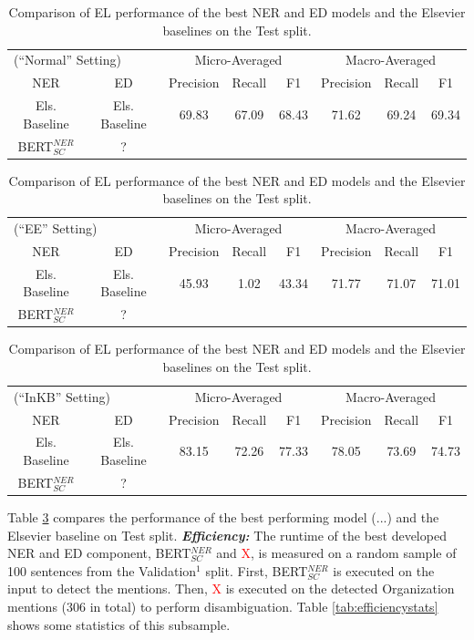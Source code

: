 \documentclass{report}
\theoremstyle{definition}
\theoremstyle{remark}
\begin{document}
\begin{table}
    \centering
    \begin{tabular}{c c c c c| c c c}
    \multicolumn{2}{l}{(``Normal'' Setting)}&\multicolumn{3}{c|}{Micro-Averaged}&\multicolumn{3}{c}{Macro-Averaged} \\
    NER & ED &Precision&Recall&F1&Precision&Recall&F1\\
    \hline
    Els. Baseline & Els. Baseline & 69.83	&67.09&	68.43&	71.62&	69.24&	69.34
\\
    BERT$_{SC}^{NER}$ & ? & \\
    \end{tabular}
    
    \vspace{0.5cm}\begin{tabular}{c c c c c| c c c}
    \multicolumn{2}{l}{(``EE'' Setting)}&\multicolumn{3}{c|}{Micro-Averaged}&\multicolumn{3}{c}{Macro-Averaged} \\
    NER & ED &Precision&Recall&F1&Precision&Recall&F1\\
    \hline
    Els. Baseline & Els. Baseline & 45.93&	1.02&	43.34&	71.77&	71.07	&71.01
\\
    BERT$_{SC}^{NER}$ & ? & \\
    \end{tabular}
    
    \vspace{0.5cm}\begin{tabular}{c c c c c| c c c}
    \multicolumn{2}{l}{(``InKB'' Setting)}&\multicolumn{3}{c|}{Micro-Averaged}&\multicolumn{3}{c}{Macro-Averaged} \\
    NER & ED &Precision&Recall&F1&Precision&Recall&F1\\
    \hline
    Els. Baseline & Els. Baseline & 83.15&	72.26&	77.33&	78.05&	73.69&	74.73
\\
    BERT$_{SC}^{NER}$ & ? & \\
    \end{tabular}
    \caption{Comparison of EL performance of the best NER and ED models and the Elsevier baselines on the Test split.}
    \label{tab:elresultstest}
\end{table}


Table \ref{tab:elresultstest} compares the performance of the best performing model (...) and the Elsevier baseline on Test split. 
\newline
\newline
\noindent \textbf{\textit{Efficiency:}} The runtime of the best developed NER and ED component, BERT$_{SC}^{NER}$ and \textcolor{red}{X}, is measured on a random sample of 100 sentences from the Validation$^1$ split. First, BERT$_{SC}^{NER}$ is executed on the input to detect the mentions. Then, \textcolor{red}{X} is executed on the detected Organization mentions (306 in total) to perform disambiguation. Table \ref{tab:efficiencystats} shows some statistics of this subsample.
\end{document}
